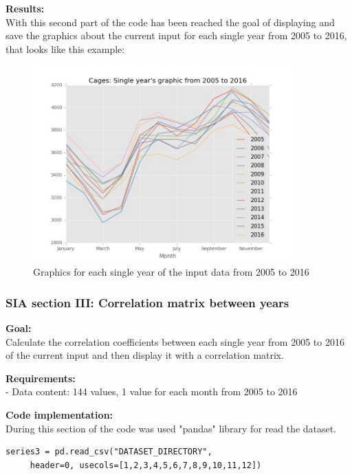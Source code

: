 \begin{minipage}{0.5\textwidth}
\textbf{Results:} \\
With this second part of the code has been reached the goal of displaying and save the graphics about the current input for each single year from 2005 to 2016, that looks like this example:
\end{minipage} \hfill
\begin{minipage}{0.45\textwidth}
\begin{figure}[H]
    \includegraphics[width=0.9\textwidth]{Files/Cages_Years.jpg}
    \caption{Graphics for each single year of the input data from 2005 to 2016}
\end{figure}
\end{minipage}



\newpage
\subsubsection{SIA section III: Correlation matrix between years}

\textbf{Goal:}\\
Calculate the correlation coefficients between each single year from 2005 to 2016 of the current input and then display it with a correlation matrix.

\textbf{Requirements:}\\
- Data content: 144 values, 1 value for each month from 2005 to 2016

\textbf{Code implementation:}\\
During this section of the code was used "pandas" library for read the dataset.
\begin{lstlisting}
series3 = pd.read_csv("DATASET_DIRECTORY",
	 header=0, usecols=[1,2,3,4,5,6,7,8,9,10,11,12])
\end{lstlisting}

